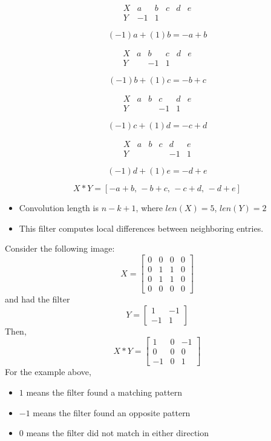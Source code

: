 \documentclass{article}
\begin{document}
\[
\begin{array}{c|ccccc}
X & a & b & c & d & e \\
\hline
Y & -1 & 1 &   &   &
\end{array}
\]

\[
    (-1)a + (1)b = -a + b
\]

\[
\begin{array}{c|ccccc}
X & a & b & c & d & e \\
\hline
Y &   & -1 & 1 &   &
\end{array}
\]

\[
    (-1)b + (1)c = -b + c
\]

\[
\begin{array}{c|ccccc}
X & a & b & c & d & e \\
\hline
Y &   &   & -1 & 1 &
\end{array}
\]

\[
    (-1)c + (1)d = -c + d
\]

\[
\begin{array}{c|ccccc}
X & a & b & c & d & e \\
\hline
Y &   &   &   & -1 & 1
\end{array}
\]

\[
    (-1)d + (1)e = -d + e
\]

\[
    X * Y
    =
    [-a+b,\,-b+c,\,-c+d,\,-d+e]
\]

\begin{itemize}
    \item Convolution length is $n - k + 1$, where $len(X) = 5$, $len(Y) = 2$
    \item This filter computes local differences between neighboring entries.
\end{itemize}
Consider the following image:
\[
X= 
\begin{bmatrix}
    0 & 0 & 0 & 0 \\
    0 & 1 & 1 & 0 \\
    0 & 1 & 1 & 0 \\
    0 & 0 & 0 & 0
\end{bmatrix}
\]
and had the filter 
\[
    Y = \begin{bmatrix}
        1 & -1 \\
        -1 & 1
    \end{bmatrix}
\]
Then, 
\[
    X*Y = \begin{bmatrix}
        1 & 0 & -1 \\
        0 & 0 & 0 \\
        -1 & 0 & 1
    \end{bmatrix}
\]
For the example above,
\begin{itemize}
    \item $1$ means the filter found a matching pattern
    \item $-1$ means the filter found an opposite pattern
    \item $0$ means the filter did not match in either direction
\end{itemize}
\end{document}
